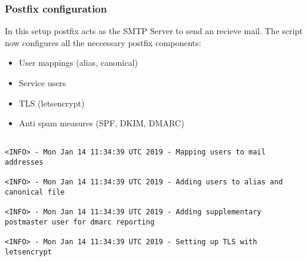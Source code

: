  \subsubsection{Postfix configuration}
 In this setup postfix acts as the \gls{SMTP} Server to send an recieve mail. The script now configures all the neccessary postfix components:
 \begin{itemize}
 \item{User mappings (alias, canonical)}
 \item{Service users}
 \item{\gls{TLS} (letsencrypt)}
 \item{Anti spam measures (\gls{SPF}, \gls{DKIM}, \gls{DMARC})}
 \end{itemize} 
 \begin{lstlisting}[escapeinside=||]    

<INFO> - Mon Jan 14 11:34:39 UTC 2019 - Mapping users to mail addresses
                                                                                                                                                                                                                                                                                                                                              
<INFO> - Mon Jan 14 11:34:39 UTC 2019 - Adding users to alias and canonical file
                                                                                                                                                                                                                                                                                                                                              
<INFO> - Mon Jan 14 11:34:39 UTC 2019 - Adding supplementary postmaster user for dmarc reporting
                                                                                                                                                                                                                                                                                                                                              
<INFO> - Mon Jan 14 11:34:39 UTC 2019 - Setting up TLS with letsencrypt
                                                                                                                                                                                                                                                                                                                                              

\end{lstlisting}
